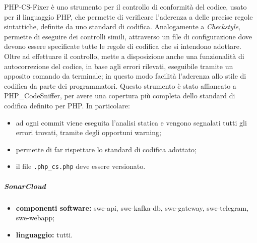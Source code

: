 					PHP-CS-Fixer è uno strumento per il controllo di conformità del codice, usato per il linguaggio PHP, che permette di verificare l'aderenza a delle precise regole sintattiche, definite da uno standard di codifica.
					\newline
					Analogamente a \textit{Checkstyle}, permette di eseguire dei controlli simili, attraverso un file di configurazione dove devono essere specificate tutte le regole di codifica che si intendono adottare.
					\newline
					Oltre ad effettuare il controllo, mette a disposizione anche una funzionalità di autocorrezione del codice, in base agli errori rilevati, eseguibile tramite un apposito comando da terminale; in questo modo facilità l'aderenza allo stile di codifica da parte dei programmatori.
					\newline
					Questo strumento è stato affiancato a PHP\_CodeSniffer, per avere una copertura più completa dello standard di codifica definito per PHP. In particolare:
					\begin{itemize}
						\item ad ogni commit viene eseguita l'analisi statica e vengono segnalati tutti gli errori trovati, tramite degli opportuni warning;
						\item permette di far rispettare lo standard di codifica adottato;
						\item il file \verb!.php_cs.php! deve essere versionato.
					\end{itemize}
				
				\subparagraph{SonarCloud}
					
					\begin{itemize}
						\item \textbf{componenti software:} swe-api, swe-kafka-db, swe-gateway, swe-telegram, swe-webapp;
						\item \textbf{linguaggio:} tutti.
					\end{itemize}
					
